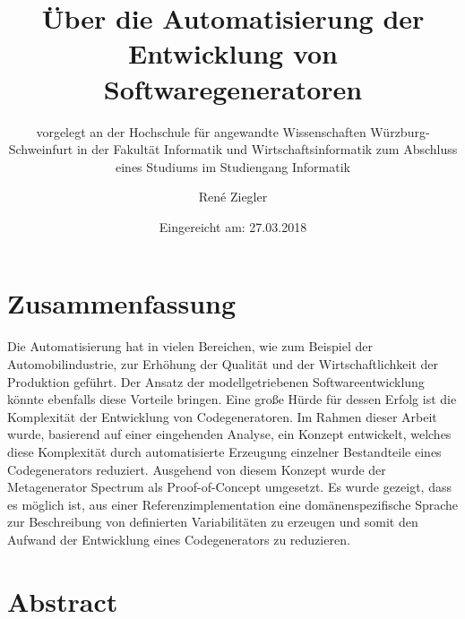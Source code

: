 \documentclass[12pt,oneside,a4paper,parskip]{scrbook}
\def\BaAuthor{René Ziegler}
\def\BaTitle{Über die Automatisierung der Entwicklung von Softwaregeneratoren}
\def\BaSupervisorOne{Prof.\ Dr.\ Peter Braun}
\def\BaSupervisorTwo{M.Sc. Tobias Fertig}
\def\BaDeadline{27.03.2018}
\begin{document}


\frontmatter
\titlehead{%
{Hochschule für angewandte Wissenschaften Würzburg-Schweinfurt\\
Fakultät Informatik und Wirtschaftsinformatik}}
\subject{Bachelorarbeit}
\title{\BaTitle\\[15mm]}
\subtitle{\normalsize{vorgelegt an der Hochschule f\"{u}r angewandte Wissenschaften W\"{u}rzburg-Schweinfurt in der Fakult\"{a}t Informatik und Wirtschaftsinformatik zum Abschluss eines Studiums im Studiengang Informatik}}
\author{\BaAuthor}
\date{\normalsize{Eingereicht am: \BaDeadline}}
\publishers{
\normalsize{Erstpr\"{u}fer: \BaSupervisorOne}\\
\normalsize{Zweitpr\"{u}fer: \BaSupervisorTwo}\\
}


\maketitle



\section*{Zusammenfassung}

Die Automatisierung hat in vielen Bereichen, wie zum Beispiel der Automobilindustrie, zur Erhöhung der Qualität und der Wirtschaftlichkeit der Produktion geführt. Der Ansatz der modellgetriebenen Softwareentwicklung könnte ebenfalls diese Vorteile bringen. Eine große Hürde für dessen Erfolg ist die Komplexität der Entwicklung von Codegeneratoren. Im Rahmen dieser Arbeit wurde, basierend auf einer eingehenden Analyse, ein Konzept entwickelt, welches diese Komplexität durch automatisierte Erzeugung einzelner Bestandteile eines Codegenerators reduziert. Ausgehend von diesem Konzept wurde der Metagenerator Spectrum als Proof-of-Concept umgesetzt. Es wurde gezeigt, dass es möglich ist, aus einer Referenzimplementation eine domänenspezifische Sprache zur Beschreibung von definierten Variabilitäten zu erzeugen und somit den Aufwand der Entwicklung eines Codegenerators zu reduzieren.

\section*{Abstract}
\end{document}
